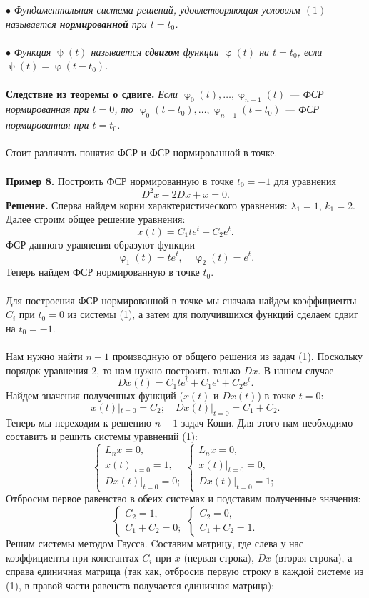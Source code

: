 \documentclass[a4paper, 12pt]{article}
\renewcommand{\varphi}{\upvarphi}
\renewcommand{\psi}{\uppsi}
\begin{document}
$\bullet$ \textit{Фундаментальная система решений, удовлетворяющая условиям $(1)$ называется \textbf{нормированной} при $t = t_0$.}\\\\
$\bullet$ \textit{Функция $\psi(t)$ называется \textbf{сдвигом} функции $\varphi(t)$ на $t=t_0$, если $\psi(t) = \varphi(t-t_0)$.}\\\\
\textbf{Следствие из теоремы о сдвиге.} \textit{Если $\varphi_0(t),\ldots,\varphi_{n-1}(t)$ --- ФСР нормированная при $t=0$, то $\varphi_0(t-t_0),\ldots,\varphi_{n-1}(t-t_0)$ --- ФСР нормированная при $t=t_0$.}\\\\
Стоит различать понятия ФСР и ФСР нормированной в точке.\\\\
\textbf{Пример 8.}  Построить ФСР нормированную в точке $t_0 = -1$ для уравнения $$D^2x -2Dx + x = 0.$$
\textbf{Решение.} Сперва найдем корни характеристического уравнения: $\lambda_1 = 1$, $k_1 = 2$. Далее строим общее решение уравнения: $$x(t) = C_1te^t + C_2e^t.$$
ФСР данного уравнения образуют функции $$\varphi_1(t) = te^t,\quad \varphi_2(t) = e^t.$$ Теперь найдем ФСР нормированную в точке $t_0$.\\\\
Для построения ФСР нормированной в точке мы сначала найдем коэффициенты $C_i$ при $t_0 = 0$ из системы (1), а затем для получившихся функций сделаем сдвиг на $t_0 = -1$.\\\\ Нам нужно найти $n-1$ производную от общего решения из задач (1). Поскольку порядок уравнения 2, то нам нужно построить только $Dx$. В нашем случае $$Dx(t) = C_1te^t + C_1e^t + C_2e^t.$$
Найдем значения полученных функций ($x(t)$ и $Dx(t)$) в точке $t = 0$: $$x(t)|_{t=0} = C_2;\quad Dx(t)|_{t=0} = C_1 + C_2.$$
Теперь мы переходим к решению $n-1$ задач Коши. Для этого нам необходимо составить и решить системы уравнений (1):
$$\begin{cases}
	L_nx = 0,\\
	x(t)|_{t=0} = 1,\\
	Dx(t)|_{t=0} = 0;
\end{cases} \begin{cases}
L_nx = 0,\\
x(t)|_{t=0} = 0,\\
Dx(t)|_{t=0} = 1;
\end{cases}$$ Отбросим первое равенство в обеих системах и подставим полученные значения:
$$\begin{cases}
	C_2 = 1,\\
	C_1 + C_2 = 0;
\end{cases}\begin{cases}
C_2 = 0,\\
C_1 + C_2 = 1.
\end{cases}$$ Решим системы методом Гаусса. Cоставим матрицу, где слева у нас коэффициенты при константах $C_i$ при $x$ (первая строка), $Dx$ (вторая строка), а справа единичная матрица (так как, отбросив первую строку в каждой системе из (1), в правой части равенств получается единичная матрица):
\end{document}
